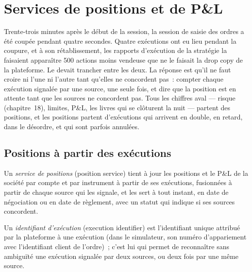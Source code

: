 \chapter{Services de positions et de P\&L}\label{ch:pl:position-and-pnl-services}

Trente-trois minutes après le début de la session, la session de saisie des ordres a été coupée pendant quatre secondes. Quatre exécutions ont eu lieu pendant la coupure, et
à son rétablissement, les rapports d'exécution de la stratégie la faisaient apparaître 500 actions moins vendeuse que ne le faisait la drop copy de la plateforme. Le  devait
trancher entre les deux. La réponse est qu'il ne faut croire ni l'une ni l'autre tant qu'elles ne concordent pas~: compter chaque exécution signalée par une source, une seule fois, et dire que la
position est en attente tant que les sources ne concordent pas. Tous les chiffres aval --- risque (chapitre~18), limites, P\&L, les livres qui se clôturent la nuit ---
partent des positions, et les positions partent d'exécutions qui arrivent en double, en retard, dans le désordre, et qui sont parfois annulées.

\section{Positions à partir des exécutions}

\begin{definition}\label{def:pl:position-and-pnl-services:service}
Un \emph{service de positions} (position service) tient à jour les positions et le P\&L de la société par compte et par instrument à partir de ses exécutions,
fusionnées à partir de chaque source qui les signale, et les sert à tout instant, en date de négociation ou en date de règlement, avec un statut qui indique
si ses sources concordent.
\end{definition}

\begin{definition}\label{def:pl:position-and-pnl-services:execid}
Un \emph{identifiant d'exécution} (execution identifier) est l'identifiant unique attribué par la plateforme à une exécution (dans le simulateur, son numéro
d'appariement avec l'identifiant client de l'ordre)~; c'est lui qui permet de reconnaître sans ambiguïté une exécution signalée par deux sources, ou deux fois par une même source.
\end{definition}

